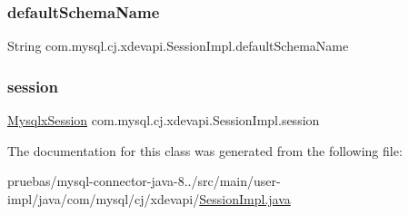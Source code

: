 \subsubsection{\texorpdfstring{default\+Schema\+Name}{defaultSchemaName}}
{\footnotesize\ttfamily String com.\+mysql.\+cj.\+xdevapi.\+Session\+Impl.\+default\+Schema\+Name\hspace{0.3cm}{\ttfamily [protected]}}

\mbox{\label{classcom_1_1mysql_1_1cj_1_1xdevapi_1_1_session_impl_a24bb736eef317972feb7dfeaad760f82}} 
\subsubsection{\texorpdfstring{session}{session}}
{\footnotesize\ttfamily \mbox{\hyperlink{classcom_1_1mysql_1_1cj_1_1_mysqlx_session}{Mysqlx\+Session}} com.\+mysql.\+cj.\+xdevapi.\+Session\+Impl.\+session\hspace{0.3cm}{\ttfamily [protected]}}



The documentation for this class was generated from the following file\+:\begin{DoxyCompactItemize}
\item 
pruebas/mysql-\/connector-\/java-\/8../src/main/user-\/impl/java/com/mysql/cj/xdevapi/\mbox{\hyperlink{_session_impl_8java}{Session\+Impl.\+java}}\end{DoxyCompactItemize}

